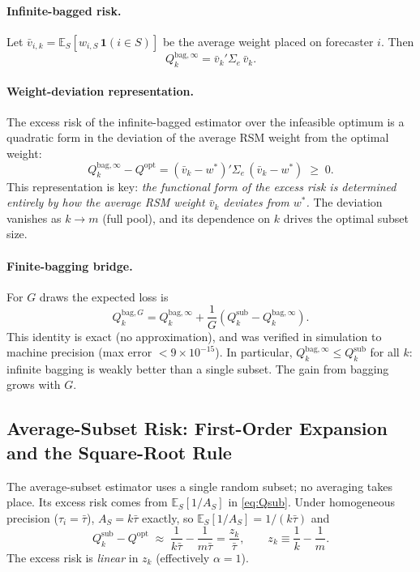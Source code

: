 \documentclass[12pt,a4paper]{article}
\begin{document}
\paragraph{Infinite-bagged risk.}
Let $\bar v_{i,k} = \mathbb{E}_S[w_{i,S}\,\mathbf{1}(i\in S)]$ be the
average weight placed on forecaster $i$. Then
\begin{equation}\label{eq:Qbag}
Q_k^{\mathrm{bag},\infty} = \bar v_k'\Sigma_e\,\bar v_k.
\end{equation}

\paragraph{Weight-deviation representation.}
The excess risk of the infinite-bagged estimator over the infeasible optimum
is a quadratic form in the deviation of the average RSM weight from the
optimal weight:
\begin{equation}\label{eq:Rbag}
Q_k^{\mathrm{bag},\infty} - Q^{\mathrm{opt}}
= (\bar v_k - w^*)'\Sigma_e\,(\bar v_k - w^*) \;\geq\; 0.
\end{equation}
This representation is key: \emph{the functional form of the excess risk
is determined entirely by how the average RSM weight $\bar v_k$ deviates
from $w^*$.} The deviation vanishes as $k \to m$ (full pool), and its
dependence on $k$ drives the optimal subset size.

\paragraph{Finite-bagging bridge.}
For $G$ draws the expected loss is
\begin{equation}\label{eq:bridge}
Q_k^{\mathrm{bag},G}
= Q_k^{\mathrm{bag},\infty}
+ \frac{1}{G}\!\left(Q_k^{\mathrm{sub}} - Q_k^{\mathrm{bag},\infty}\right).
\end{equation}
This identity is exact (no approximation), and was verified in simulation to
machine precision (max error $< 9 \times 10^{-15}$). In particular,
$Q_k^{\mathrm{bag},\infty} \leq Q_k^{\mathrm{sub}}$ for all $k$: infinite
bagging is weakly better than a single subset. The gain from bagging grows
with $G$.

\subsection{Average-Subset Risk: First-Order Expansion and the Square-Root Rule}

The average-subset estimator uses a single random subset; no averaging takes
place. Its excess risk comes from $\mathbb{E}_S[1/A_S]$ in
\eqref{eq:Qsub}. Under homogeneous precision ($\tau_i = \bar\tau$), $A_S
= k\bar\tau$ exactly, so $\mathbb{E}_S[1/A_S] = 1/(k\bar\tau)$ and
\begin{equation}\label{eq:Qsub_leading}
Q_k^{\mathrm{sub}} - Q^{\mathrm{opt}}
\;\approx\; \frac{1}{k\bar\tau} - \frac{1}{m\bar\tau}
= \frac{z_k}{\bar\tau}, \qquad z_k \equiv \frac{1}{k} - \frac{1}{m}.
\end{equation}
The excess risk is \emph{linear} in $z_k$ (effectively $\alpha=1$).
\end{document}
